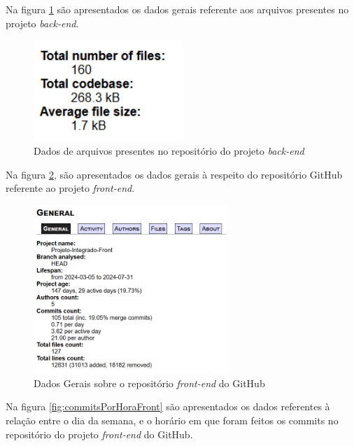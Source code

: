 \newpage

Na figura \ref{fig:infoArquivosBack} são apresentados os dados gerais referente aos arquivos presentes no projeto \textit{back-end}.

    \begin{figure}[ht]
        \centering
\includegraphics[width=0.5\textwidth]{images/info-arquivos-stats-back.png}
        \caption{Dados de arquivos presentes no repositório do projeto \textit{back-end}}
        \label{fig:infoArquivosBack}
    \end{figure}


Na figura \ref{fig:dadosGeraisFront}, são apresentados os dados gerais à respeito do repositório GitHub referente ao projeto \textit{front-end}.

\begin{figure}[ht]
        \centering
\includegraphics[width=0.65\textwidth]{images/dados-gerais-stats-front.png}
        \caption{Dados Gerais sobre o repositório \textit{front-end} do GitHub}
        \label{fig:dadosGeraisFront}
    \end{figure}

\newpage


Na figura \ref{fig:commitsPorHoraFront} são apresentados os dados referentes à relação entre o dia da semana, e o horário em que foram feitos os commits no repositório do projeto \textit{front-end} do GitHub.

